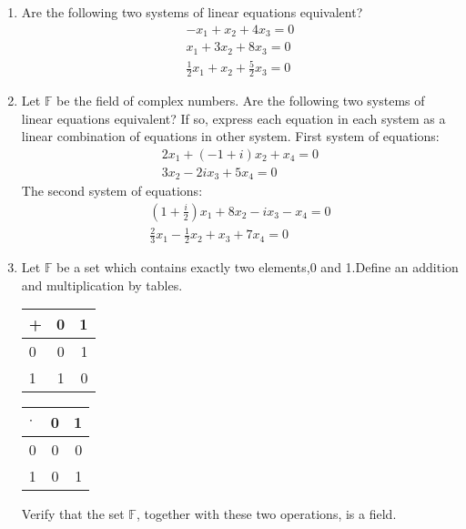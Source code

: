 \begin{enumerate}[label=\thesubsection.\arabic*.,ref=\thesubsection.\theenumi]
\item Are the following two systems of linear equations equivalent?
\begin{equation} \label{eq:solutions/1/1/3/eq:eq1}
\begin{split}
    -x_1+x_2+4x_3=0\\
    x_1+3x_2+8x_3=0\\
    \frac{1}{2}x_1+x_2+\frac{5}{2}x_3=0
\end{split}
\end{equation}
\solution

%
\item Let $\mathbb{F}$  be the field of complex numbers. Are the following two systems of linear equations equivalent? If so, express each equation in each system as a linear combination of equations in other system. First system of equations:
\begin{align}
2x_1+(-1+i)x_2+x_4=0\\
3x_2-2ix_3+5x_4=0
\end{align}
The second system of equations:
\begin{align}
(1+\frac{i}{2})x_1+8x_2-ix_3-x_4=0\\
\frac{2}{3}x_1-\frac{1}{2}x_2+x_3+7x_4=0
\end{align}
%
\solution

\item Let $\mathbb{F}$ be a set which contains exactly two elements,0 and 1.Define an addition and multiplication by tables.
\begin{table}[h!]
  \begin{center}
    \label{eq:solutions/1/1/5/tab:table1}
    \begin{tabular}{l|c|r}
      + & 0 & 1 \\
      \hline
      0 & 0 & 1\\
      1 & 1 & 0
    \end{tabular}
  \end{center}
\end{table}
\begin{table}[h!]
  \begin{center}
    \label{eq:solutions/1/1/5/tab:table2}
    \begin{tabular}{l|c|r}
      $\cdot$ & 0 & 1 \\
      \hline
      0 & 0 & 0\\
      1 & 0 & 1
    \end{tabular}
  \end{center}
\end{table}
  Verify that the set $\mathbb{F}$, together with these two operations, is a field.

\end{enumerate}
